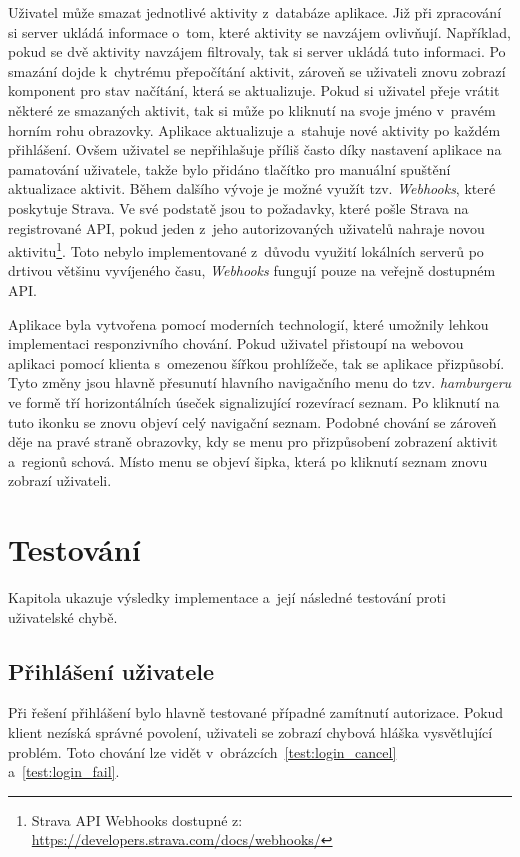 Uživatel může smazat jednotlivé aktivity z~databáze aplikace. Již při zpracování si server ukládá informace o~tom, které aktivity se navzájem ovlivňují. Například, pokud se dvě aktivity navzájem filtrovaly, tak si server ukládá tuto informaci. Po smazání dojde k~chytrému přepočítání aktivit, zároveň se uživateli znovu zobrazí komponent pro stav načítání, která se aktualizuje. Pokud si uživatel přeje vrátit některé ze smazaných aktivit, tak si může  po kliknutí na svoje jméno v~pravém horním rohu obrazovky. 
Aplikace aktualizuje a~stahuje nové aktivity po každém přihlášení. Ovšem uživatel se nepřihlašuje příliš často díky nastavení aplikace na pamatování uživatele, takže bylo přidáno tlačítko pro manuální spuštění aktualizace aktivit. Během dalšího vývoje je možné využít tzv. \emph{Webhooks}, které poskytuje Strava. Ve své podstatě jsou to požadavky, které pošle Strava na registrované API, pokud jeden z~jeho autorizovaných uživatelů nahraje novou aktivitu\footnote{Strava API Webhooks dostupné z: \url{https://developers.strava.com/docs/webhooks/}}. Toto nebylo implementované z~důvodu využití lokálních serverů po drtivou většinu vyvíjeného času, \emph{Webhooks} fungují pouze na veřejně dostupném API.

Aplikace byla vytvořena pomocí moderních technologií, které umožnily lehkou implementaci responzivního chování. Pokud uživatel přistoupí na webovou aplikaci pomocí klienta s~omezenou šířkou prohlížeče, tak se aplikace přizpůsobí. Tyto změny jsou hlavně přesunutí hlavního navigačního menu do tzv. \emph{hamburgeru} ve formě tří horizontálních úseček signalizující rozevírací seznam. Po kliknutí na tuto ikonku se znovu objeví celý navigační seznam. Podobné chování se zároveň děje na pravé straně obrazovky, kdy se menu pro přizpůsobení zobrazení aktivit a~regionů schová. Místo menu se objeví šipka, která po kliknutí seznam znovu zobrazí uživateli. 

\chapter{Testování}
Kapitola ukazuje výsledky implementace a~její následné testování proti uživatelské chybě.
\section{Přihlášení uživatele}
Při řešení přihlášení bylo hlavně testované případné zamítnutí autorizace. Pokud klient nezíská správné povolení, uživateli se zobrazí chybová hláška vysvětlující problém. Toto chování lze vidět v~obrázcích~\ref{test:login_cancel} a~\ref{test:login_fail}.

